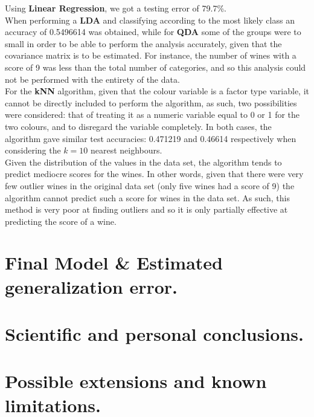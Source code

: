 \documentclass[10pt]{article}
\begin{document}
Using \textbf{Linear Regression}, we got a testing error of 79.7\%.\\

When performing a \textbf{LDA} and classifying according to the most likely class an accuracy of 0.5496614 was obtained, while for \textbf{QDA} some of the groups were to small in order to be able to perform the analysis accurately, given that the covariance matrix is to be estimated. For instance, the number of wines with a score of 9 was less than the total number of categories, and so this analysis could not be performed with the entirety of the data.\\

For the \textbf{kNN} algorithm, given that the colour variable is a factor type variable, it cannot be directly included to perform the algorithm, as such, two possibilities were considered: that of treating it as a numeric variable equal to 0 or 1 for the two colours, and to disregard the variable completely. In both cases, the algorithm gave similar test accuracies: 0.471219 and 0.46614 respectively when considering the $k=10$ nearest neighbours.\\

Given the distribution of the values in the data set, the algorithm tends to predict mediocre scores for the wines. In other words, given that there were very few outlier wines in the original data set (only five wines had a score of 9) the algorithm cannot predict such a score for wines in the data set. As such, this method is very poor at finding outliers and so it is only partially effective at predicting the score of a wine.
\section{Final Model \& Estimated generalization error.}
\section{Scientific and personal conclusions.}
\section{Possible extensions and known limitations.}
\end{document}
